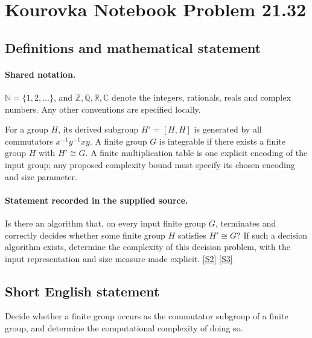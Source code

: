 \documentclass[11pt]{article}
\newcommand{\sref}[2]{\hyperlink{source:#1:#2}{[S#2]}}
\begin{document}
\section{Kourovka Notebook Problem 21.32}\label{statement}

\subsection{Definitions and mathematical statement}

\paragraph{Shared notation.}$\mathbb N=\{1,2,\ldots\}$, and $\mathbb Z,\mathbb Q,\mathbb R,\mathbb C$ denote the integers, rationals, reals and complex numbers. Any other conventions are specified locally.


For a group $H$, its derived subgroup $H'=[H,H]$ is generated by all commutators $x^{-1}y^{-1}xy$. A finite group $G$ is integrable if there exists a finite group $H$ with $H'\cong G$. A finite multiplication table is one explicit encoding of the input group; any proposed complexity bound must specify its chosen encoding and size parameter.
\paragraph{Statement recorded in the supplied source.}
Is there an algorithm that, on every input finite group $G$, terminates and correctly decides whether some finite group $H$ satisfies $H'\cong G$? If such a decision algorithm exists, determine the complexity of this decision problem, with the input representation and size measure made explicit. \sref{statement}{2} \sref{statement}{3}
\subsection{Short English statement}
Decide whether a finite group occurs as the commutator subgroup of a finite group, and determine the computational complexity of doing so.
\end{document}
